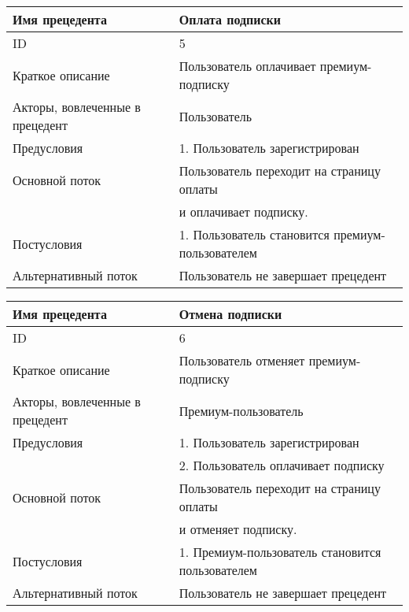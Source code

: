 \bigskip\noindent
\begin{tabular}{|l|l|}
    \hline Имя прецедента                  & Оплата подписки \\
    \hline ID                              & 5 \\
    \hline Краткое описание                & Пользователь оплачивает премиум-подписку \\
    \hline Акторы, вовлеченные в прецедент & Пользователь \\
    \hline Предусловия                     & 1. Пользователь зарегистрирован \\
    \hline Основной поток                  & Пользователь переходит на страницу оплаты \\
                                           & и оплачивает подписку. \\
    \hline Постусловия                     & 1. Пользователь становится премиум-пользователем \\
    \hline Альтернативный поток            & Пользователь не завершает прецедент \\
    \hline
\end{tabular}

\bigskip\noindent
\begin{tabular}{|l|l|}
    \hline Имя прецедента                  & Отмена подписки \\
    \hline ID                              & 6 \\
    \hline Краткое описание                & Пользователь отменяет премиум-подписку \\
    \hline Акторы, вовлеченные в прецедент & Премиум-пользователь \\
    \hline Предусловия                     & 1. Пользователь зарегистрирован \\
                                           & 2. Пользователь оплачивает подписку \\
    \hline Основной поток                  & Пользователь переходит на страницу оплаты \\
                                           & и отменяет подписку. \\
    \hline Постусловия                     & 1. Премиум-пользователь становится пользователем \\
    \hline Альтернативный поток            & Пользователь не завершает прецедент \\
    \hline
\end{tabular}

